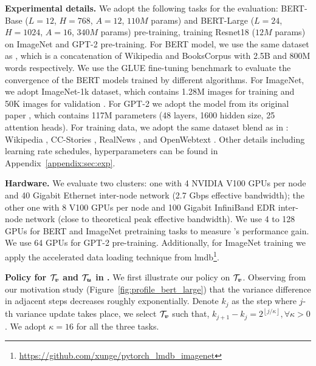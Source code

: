 \textbf{Experimental details.}
We adopt the following tasks for the evaluation: BERT-Base ($L=12$, $H=768$, $A=12$, $110M$ params) and BERT-Large ($L=24$, $H=1024$, $A=16$, $340M$
params) pre-training, training Resnet18 ($12M$ params) on ImageNet \citep{he2016deep} and GPT-2 pre-training. For BERT model, we use the same dataset as \citep{devlin2018bert}, which is a concatenation of Wikipedia and BooksCorpus with 2.5B and 800M words respectively. We use the GLUE fine-tuning benchmark \citep{wang2018glue} to evaluate the convergence of the BERT models trained by different algorithms. For ImageNet, we adopt ImageNet-1k dataset, which contains 1.28M images for training and 50K images for validation \citep{deng2009imagenet}.
For GPT-2 we adopt the model from its original paper \citep{radford2019better}, which contains 117M parameters (48 layers, 1600 hidden size, 25 attention heads). For training data, we adopt the same dataset blend as in \citep{shoeybi2019megatron}: Wikipedia \citep{devlin2018bert}, CC-Stories \citep{trinh2018simple}, RealNews \citep{zellers2019defending}, and OpenWebtext \citep{radford2019better}. Other details including learning rate schedules, hyperparameters can be found in Appendix~\ref{appendix:sec:exp}.

\textbf{Hardware.}
We evaluate two clusters: one with 4 NVIDIA V100 GPUs per node and 40 Gigabit Ethernet inter-node network (2.7 Gbps effective bandwidth); the other one with 8 V100 GPUs per node and 100 Gigabit InfiniBand EDR inter-node network (close to theoretical peak effective bandwidth). We use 4 to 128 GPUs for BERT and ImageNet pretraining tasks to measure {\myalgo}'s performance gain.
We use 64 GPUs for GPT-2 pre-training.
Additionally, for ImageNet training we apply the accelerated data loading technique from lmdb\footnote{\url{https://github.com/xunge/pytorch_lmdb_imagenet}}.


\textbf{Policy for $\mathcal{T}_{\boldsymbol{v}}$ and $\mathcal{T}_{\boldsymbol{u}}$ in {\myalgo}.}
We first illustrate our policy on $\mathcal{T}_{\boldsymbol{v}}$.
Observing from our motivation study (Figure~\ref{fig:profile_bert_large}) that the variance difference in adjacent steps decreases roughly exponentially. Denote $k_j$ as the step where $j$-th variance update takes place, we select $\mathcal{T}_{\boldsymbol{v}}$ such that, $k_{j+1} - k_j = 2^{\left\lfloor j/\kappa\right\rfloor}, \forall \kappa>0$.
We adopt $\kappa=16$ for all the three tasks.

